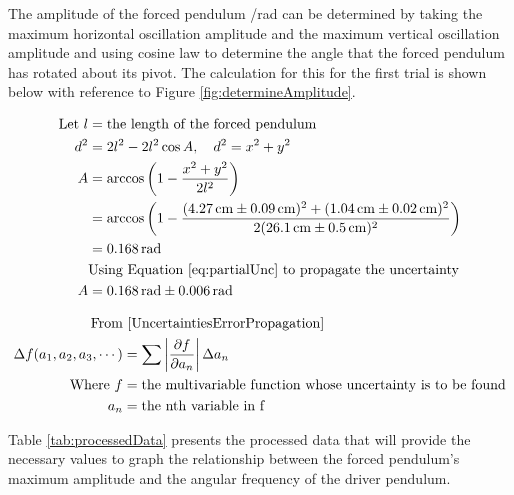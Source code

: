 \documentclass[letterpaper, 12pt]{article}
\begin{document}

The amplitude of the forced pendulum /\unit{rad} can be determined
by taking the maximum horizontal oscillation amplitude
and the maximum vertical oscillation amplitude
and using cosine law to determine the angle
that the forced pendulum has rotated about its
pivot. The calculation for this for the first
trial is shown below with reference to Figure \ref*{fig:determineAmplitude}.

\begingroup
\allowdisplaybreaks
\begin{align*}
    \text{Let } l & = \text{the length of the forced pendulum }
    \\
    d^2           & = 2l^2 - 2l^2\cos A,\quad d^2 = x^2 + y^2
    \\
    A             & = \arccos \left( 1 - \frac{x^2 + y^2}{2l^2} \right)
    \\
                  & = \arccos \left( 1 - \frac{( \SI{4.27}{cm} \pm \SI{0.09}{cm} )^2 + (\SI{1.04}{cm} \pm \SI{0.02}{cm})^2}{2(\SI{26.1}{cm} \pm \SI{0.5}{cm})^2 } \right)
    \\
                  & = \SI{0.168}{rad}
    \\
                  & \text{Using Equation \ref*{eq:partialUnc} to propagate the uncertainty}
    \\
    A             & = \SI{0.168}{rad} \pm \SI{0.006}{rad}
\end{align*}
\endgroup

\begin{align}
    \text{From}                     & \text{ \cite{UncertaintiesErrorPropagation}} \nonumber
    \\
    \Delta f(a_1, a_2, a_3, \cdots) & = \sum \left| \pdv{f}{a_n} \right| \Delta a_n \label{eq:partialUnc}
    \\
    \text{Where } f                 & = \text{the multivariable function whose uncertainty is to be found} \nonumber
    \\
    a_n                             & = \text{the nth variable in f} \nonumber
\end{align}

Table \ref*{tab:processedData} presents the processed data
that will provide the necessary values to graph the
relationship between the forced pendulum's maximum
amplitude and the angular frequency of the driver
pendulum.
\end{document}
